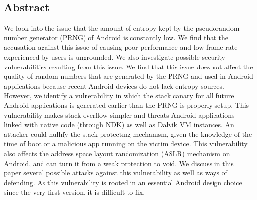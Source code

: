 \subsection*{Abstract}
We look into the issue that the amount of entropy kept by the pseudorandom number generator (PRNG) of Android is constantly low. We find that the accusation against this issue of causing poor performance and low frame rate experienced by users is ungrounded. We also investigate possible security vulnerabilities resulting from this issue. We find that this issue does not affect the quality of random numbers that are generated by the PRNG and used in Android applications because recent Android devices do not lack entropy sources. However, we identify a vulnerability in which the stack canary for all future Android applications is generated earlier than the PRNG is properly setup. This vulnerability makes stack overflow simpler and threats Android applications linked with native code (through NDK) as well as Dalvik VM instances. An attacker could nullify the stack protecting mechanism, given the knowledge of the time of boot or a malicious app running on the victim device. This vulnerability also affects the address space layout randomization (ASLR) mechanism on Android, and can turn it from a weak protection to void. We discuss in this paper several possible attacks against this vulnerability as well as ways of defending. As this vulnerability is rooted in an essential Android design choice since the very first version, it is difficult to fix.

